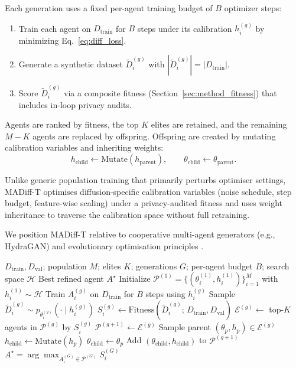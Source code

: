 \documentclass[preprint,12pt]{elsarticle}
\begin{document}
Each generation uses a fixed per-agent training budget of $B$ optimizer steps:
\begin{enumerate}
    \item Train each agent on $D_{\text{train}}$ for $B$ steps under its calibration $h_i^{(g)}$ by minimizing Eq.~\eqref{eq:diff_loss}.
    \item Generate a synthetic dataset $\tilde{D}_i^{(g)}$ with $|\tilde{D}_i^{(g)}|=|D_{\text{train}}|$.
    \item Score $\tilde{D}_i^{(g)}$ via a composite fitness (Section~\ref{sec:method_fitness}) that includes in-loop privacy audits.
\end{enumerate}
Agents are ranked by fitness, the top $K$ elites are retained, and the remaining $M-K$ agents are replaced by offspring. Offspring are created by mutating calibration variables and inheriting weights:
\begin{equation}
h_{\text{child}} \leftarrow \mathrm{Mutate}(h_{\text{parent}}),
\qquad
\theta_{\text{child}} \leftarrow \theta_{\text{parent}}.
\end{equation}

Unlike generic population training that primarily perturbs optimiser settings, MADiff-T optimises diffusion-specific calibration variables (noise schedule, step budget, feature-wise scaling) under a privacy-audited fitness and uses weight inheritance to traverse the calibration space without full retraining.

We position MADiff-T relative to cooperative multi-agent generators (e.g., HydraGAN) and evolutionary optimisation principles \cite{Back1996,Hansen2001}.

\begin{algorithm}[H]
\caption{MADiff-T: Multi-Agent Evolutionary Refinement for Tabular Diffusion}
\label{alg:madifft}
\footnotesize
\begin{algorithmic}[1]
\Require $D_{\text{train}},D_{\text{val}}$; population $M$; elites $K$; generations $G$; per-agent budget $B$; search space $\mathcal{H}$
\Ensure Best refined agent $A^\star$
\State Initialize $\mathcal{P}^{(1)}=\{(\theta_i^{(1)}, h_i^{(1)})\}_{i=1}^{M}$ with $h_i^{(1)}\sim\mathcal{H}$
        \State Train $A_i^{(g)}$ on $D_{\text{train}}$ for $B$ steps using $h_i^{(g)}$
        \State Sample $\tilde{D}_i^{(g)} \sim p_{\theta_i^{(g)}}(\cdot \mid h_i^{(g)})$
        \State $S_i^{(g)} \leftarrow \mathrm{Fitness}(\tilde{D}_i^{(g)};\,D_{\text{train}},D_{\text{val}})$
    \EndFor
    \State $\mathcal{E}^{(g)} \leftarrow$ top-$K$ agents in $\mathcal{P}^{(g)}$ by $S_i^{(g)}$
    \State $\mathcal{P}^{(g+1)} \leftarrow \mathcal{E}^{(g)}$
        \State Sample parent $(\theta_p, h_p) \in \mathcal{E}^{(g)}$
        \State $h_{\text{child}} \leftarrow \mathrm{Mutate}(h_p)$
        \State $\theta_{\text{child}} \leftarrow \theta_p$ 
        \State Add $(\theta_{\text{child}}, h_{\text{child}})$ to $\mathcal{P}^{(g+1)}$
    \EndWhile
\EndFor
\State \Return $A^\star=\arg\max_{A_i^{(G)}\in \mathcal{P}^{(G)}} S_i^{(G)}$
\end{algorithmic}
\end{algorithm}
\end{document}
